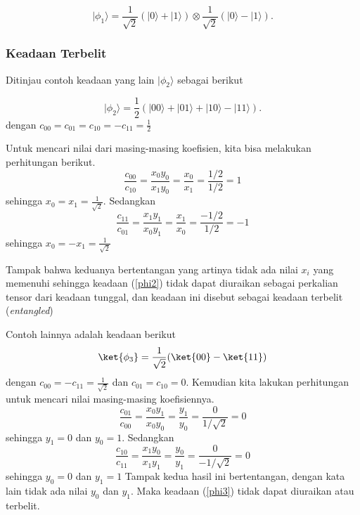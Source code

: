 \begin{equation}
|\phi_1\rangle =
\frac{1}{\sqrt{2}}
\left(
|0\rangle + |1\rangle
\right)
\otimes
\frac{1}{\sqrt{2}}
\left(
|0\rangle - |1\rangle
\right).
\end{equation}

\subsubsection{Keadaan Terbelit}
Ditinjau contoh keadaan yang lain $|\phi_2\rangle$ sebagai berikut

\begin{equation}\label{phi2}
|\phi_2\rangle =
\frac{1}{2}
\left(
|00\rangle + |01\rangle + |10\rangle - |11\rangle
\right).
\end{equation}
dengan $c_{00}=c_{01}=c_{10}=-c_{11}=\frac{1}{2}$

Untuk mencari nilai dari masing-masing koefisien, kita bisa melakukan perhitungan berikut.
\begin{equation}
	\frac{c_{00}}{c_{10}}=\frac{x_0y_0}{x_1y_0} = \frac{x_0}{x_1}=\frac{1/2}{1/2}=1
\end{equation}
sehingga $x_0=x_1=\frac{1}{\sqrt{2}}$.
Sedangkan
\begin{equation}
	\frac{c_{11}}{c_{01}}=\frac{x_1y_1}{x_0y_1} = \frac{x_1}{x_0}=\frac{-1/2}{1/2}=-1
\end{equation}
sehingga $x_0=-x_1=\frac{1}{\sqrt{2}}$

Tampak bahwa keduanya bertentangan yang artinya tidak ada nilai $x_i$ yang memenuhi sehingga keadaan (\ref{phi2}) tidak dapat diuraikan sebagai perkalian tensor dari keadaan tunggal, dan keadaan ini disebut sebagai keadaan terbelit (\textit{entangled})

Contoh lainnya adalah keadaan berikut
\begin{equation}\label{phi3}
	\ket{\phi_3}=\frac{1}{\sqrt{2}}(\ket{00}-\ket{11})
\end{equation}
dengan $c_{00}=-c_{11}=\frac{1}{\sqrt{2}}$ dan $c_{01}=c_{10}=0$.
Kemudian kita lakukan perhitungan untuk mencari nilai masing-masing koefisiennya.
\begin{equation}
	\frac{c_{01}}{c_{00}}=\frac{x_0y_1}{x_0y_0} = \frac{y_1}{y_0}=\frac{0}{1/\sqrt{2}}=0
\end{equation}
sehingga $y_1=0$ dan $y_0=1$.
Sedangkan
\begin{equation}
	\frac{c_{10}}{c_{11}}=\frac{x_1y_0}{x_1y_1} = \frac{y_0}{y_1}=\frac{0}{-1/\sqrt{2}}=0
\end{equation}
sehingga $y_0=0$ dan $y_1=1$
Tampak kedua hasil ini bertentangan, dengan kata lain tidak ada nilai $y_0$ dan $y_1$. Maka keadaan (\ref{phi3}) tidak dapat diuraikan atau terbelit.

